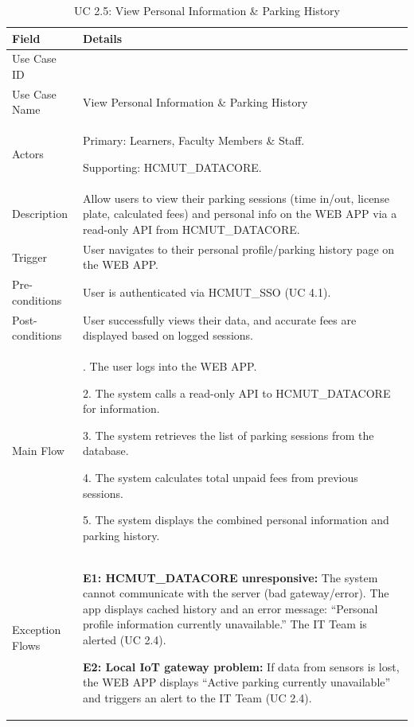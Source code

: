 \begin{table}[H]
\small
\renewcommand{\arraystretch}{1.4}
\begin{tabularx}{\textwidth}{|>{\raggedright\arraybackslash}p{3.5cm}|>{\RaggedRight\arraybackslash}X|}
\hline
\rowcolor{gray!20} \textbf{Field} & \textbf{Details} \\
\hline
Use Case ID & 2.5 \\
\hline
Use Case Name & View Personal Information \& Parking History \\
\hline
Actors & Primary: Learners, Faculty Members \& Staff. \par Supporting: HCMUT\_DATACORE. \\
\hline
Description & Allow users to view their parking sessions (time in/out, license plate, calculated fees) and personal info on the WEB APP via a read-only API from HCMUT\_DATACORE. \\
\hline
Trigger & User navigates to their personal profile/parking history page on the WEB APP. \\
\hline
Pre-conditions & User is authenticated via HCMUT\_SSO (UC 4.1). \\
\hline
Post-conditions & User successfully views their data, and accurate fees are displayed based on logged sessions. \\
\hline
Main Flow & 
1. The user logs into the WEB APP. \par
2. The system calls a read-only API to HCMUT\_DATACORE for information. \par
3. The system retrieves the list of parking sessions from the database. \par
4. The system calculates total unpaid fees from previous sessions. \par
5. The system displays the combined personal information and parking history. \\
\hline
Exception Flows & 
\textbf{E1: HCMUT\_DATACORE unresponsive:} The system cannot communicate with the server (bad gateway/error). The app displays cached history and an error message: ``Personal profile information currently unavailable.'' The IT Team is alerted (UC 2.4). \par \vspace{0.5em}
\textbf{E2: Local IoT gateway problem:} If data from sensors is lost, the WEB APP displays ``Active parking currently unavailable'' and triggers an alert to the IT Team (UC 2.4). \\
\hline
\end{tabularx}
\caption{UC 2.5: View Personal Information \& Parking History}
\label{tab:uc2.5}
\end{table}